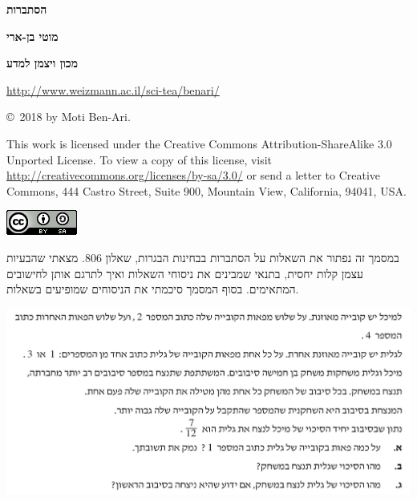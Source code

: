 \documentclass[12pt,a4paper]{article}
\begin{document}
\thispagestyle{empty}


\begin{center}
\textbf{\Huge הסתברות}

\bigskip
\bigskip
\bigskip

\textbf{\Large מוטי בן-ארי}

\bigskip

\textbf{\Large מכון ויצמן למדע}

\bigskip

\url{http://www.weizmann.ac.il/sci-tea/benari/}

\bigskip

\end{center}


\vfill

\begin{center}
\sffamily\copyright{}\  2018 by Moti Ben-Ari.
\end{center}

\begin{footnotesize}
\sffamily
This work is licensed under the Creative Commons Attribution-ShareAlike 3.0 Unported License. To view a copy of this license, visit \url{http://creativecommons.org/licenses/by-sa/3.0/} or send a letter to Creative Commons, 444 Castro Street, Suite 900, Mountain View, California, 94041, USA.
\end{footnotesize}

\begin{center}
\includegraphics[width=.2\textwidth]{../../by-sa.png}
\end{center}

\newpage
{}


במסמך זה נפתור את השאלות על הסתברות בבחינות הבגרות, שאלון
$806$.
מצאתי שהבעיות עצמן קלות יחסית, בתנאי שמבינים את ניסוחי השאלות ואיך לתרגם אותן לחישובים המתאימים. בסוף המסמך סיכמתי את הניסוחים שמופיעים בשאלות.




\textbf{}

\begin{center}
\includegraphics[width=\textwidth]{winter-2018-3}
\end{center}
\end{document}

